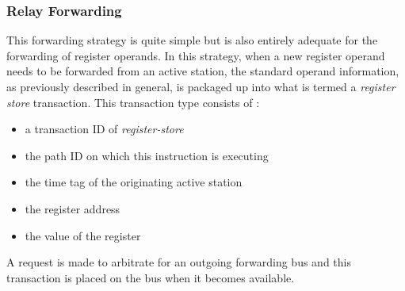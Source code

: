 \documentclass[10pt,dvips]{article}
\begin{document}
\subsubsection{Relay Forwarding}
%
This forwarding strategy is quite simple but is also entirely
adequate for the forwarding of register operands.
In this strategy, when a new register operand needs to be forwarded
from an active station, the standard operand information, as 
previously described
in general, is packaged up into what is termed
a \textit{register store} transaction.
This transaction type consists of :
%
\vspace{-0.05in}
\begin{itemize}
\vspace{-0.1in}
\item{a transaction ID of \textit{register-store}}
\vspace{-0.1in}
\item{the path ID on which this instruction is executing}
\vspace{-0.1in}
\item{the time tag of the originating active station}
\vspace{-0.1in}
\item{the register address}
\vspace{-0.1in}
\item{the value of the register}
\vspace{-0.1in}
\end{itemize}   
%
A request is made to arbitrate for an outgoing forwarding bus
and this transaction is placed on the bus when it becomes available.
\end{document}

